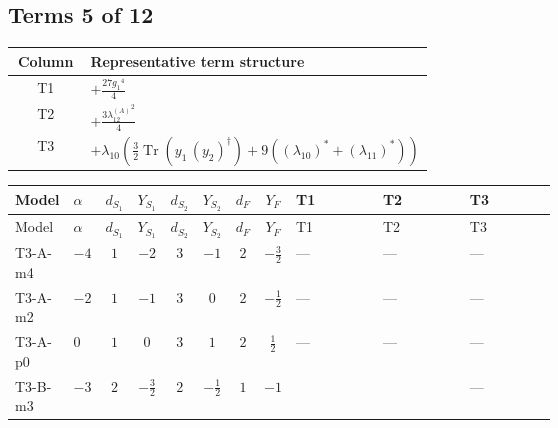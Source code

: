 \documentclass[8pt]{article}
\begin{document}
\begin{landscape}
\subsection*{Terms 5 of 12}
\begin{center}
\begin{tabular}{@{}c >{\raggedright\arraybackslash}p{0.82\linewidth}@{}}
\toprule
Column & Representative term structure \\
\midrule
T1 & \(\displaystyle +\frac{27 {g_1}^4}{4}\) \\
\midrule
T2 & \(\displaystyle +\frac{3 {\lambda_{12}^{(A)}}^2}{4}\) \\
\midrule
T3 & \(\displaystyle +{\lambda_{10}} \left(\frac{3}{2} \operatorname{Tr}\!\left({y_1}\,\left({y_2}\right)^{\dagger}\right)+9 (\left({\lambda_{10}}\right)^{*}+\left({\lambda_{11}}\right)^{*})\right)\) \\
\midrule
\bottomrule
\end{tabular}
\end{center}
\smallskip
\tiny
\begin{longtable}{@{}llcccccc >{\raggedright\arraybackslash}p{0.21\linewidth} >{\raggedright\arraybackslash}p{0.21\linewidth} >{\raggedright\arraybackslash}p{0.21\linewidth}@{}}
\toprule
Model & $\alpha$ & $d_{S_1}$ & $Y_{S_1}$ & $d_{S_2}$ & $Y_{S_2}$ & $d_F$ & $Y_F$ & T1 & T2 & T3 \\
\midrule
\endfirsthead
\toprule
Model & $\alpha$ & $d_{S_1}$ & $Y_{S_1}$ & $d_{S_2}$ & $Y_{S_2}$ & $d_F$ & $Y_F$ & T1 & T2 & T3 \\
\midrule
\endhead
T3-A-m4 & $-4$ & $1$ & $-2$ & $3$ & $-1$ & $2$ & $-\frac{3}{2}$ & --- & --- & --- \\
\midrule
T3-A-m2 & $-2$ & $1$ & $-1$ & $3$ & $0$ & $2$ & $-\frac{1}{2}$ & --- & --- & --- \\
\midrule
T3-A-p0 & $0$ & $1$ & $0$ & $3$ & $1$ & $2$ & $\frac{1}{2}$ & --- & --- & --- \\
\midrule
T3-B-m3 & $-3$ & $2$ & $-\frac{3}{2}$ & $2$ & $-\frac{1}{2}$ & $1$ & $-1$ & \scriptsize\adjustbox{max width=\linewidth}{$\begin{gathered} +\frac{27 {g_1}^4}{4}\end{gathered}$} & \scriptsize\adjustbox{max width=\linewidth}{$\begin{gathered} +\frac{3 {\lambda_{12}^{(A)}}^2}{4}\end{gathered}$} & --- \\
\midrule

\end{longtable}
\end{landscape}
\end{document}
